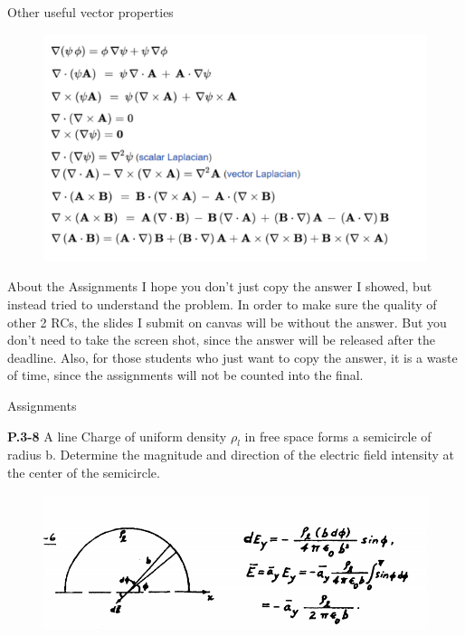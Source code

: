 \documentclass[xcolor={dvipsnames}]{beamer}
\begin{document}
\begin{frame}{Other useful vector properties}
\begin{figure}[H]
	\centering
	\includegraphics[width=0.9\linewidth]{2_3.png}
\end{figure}
\end{frame}
\begin{frame}{About the Assignments}
	I hope you don't just copy the answer I showed, but instead tried to understand the problem. In order to make sure the quality of other 2 RCs, the slides I submit on canvas will be without the answer. But you don't need to take the screen shot, since the answer will be released after the deadline. Also, for those students who just want to copy the answer, it is a waste of time, since the assignments will not be counted into the final.
\end{frame}
\begin{frame}{Assignments}
\begin{block}{\textbf{P.3-8}}
A line Charge of uniform density $\rho_l$ in free space forms a semicircle of radius b. Determine the magnitude and direction of the electric field intensity at the center of the semicircle.
\end{block}
\pause
\begin{figure}[H]
	\centering
	\includegraphics[width=0.7\linewidth]{2_4.png}
\end{figure}
\end{frame}
\end{document}
